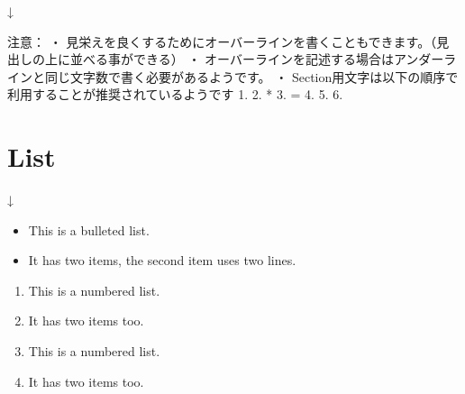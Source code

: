 \documentclass[letterpaper,10pt,dvipdfmx,openany,oneside]{sphinxmanual}
\begin{document}
↓

\noindent{}

%
\begin{sphinxVerbatim}[commandchars=\\\{\}]
注意：
・ 見栄えを良くするためにオーバーラインを書くこともできます。（見出しの上に並べる事ができる）
・ オーバーラインを記述する場合はアンダーラインと同じ文字数で書く必要があるようです。
・  Section用文字は以下の順序で利用することが推奨されているようです
  1. \PYGZsh{}
  2. *
  3. =
  4. \PYGZhy{}
  5. \PYGZca{}
  6. \PYGZdq{}
\end{sphinxVerbatim}


\section{List}
\label{\detokenize{1.chapter/basic_syntax:list}}
%
\begin{sphinxVerbatim}[commandchars=\\\{\}]
     
      
   

     
     

\end{sphinxVerbatim}

↓
\begin{itemize}
\item {} 
This is a bulleted list.

\item {} 
It has two items, the second
item uses two lines.

\end{itemize}
\begin{enumerate}
\item {} 
This is a numbered list.

\item {} 
It has two items too.

\item {} 
This is a numbered list.

\item {} 
It has two items too.

\end{enumerate}
\end{document}
